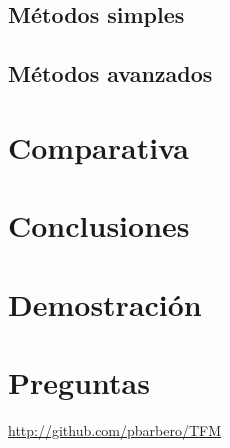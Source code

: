 \documentclass[10pt, spanish]{beamer}
\begin{document}
\subsection{M\'etodos simples}
\begin{frame}

\end{frame}

\subsection{M\'etodos avanzados}
\begin{frame}

\end{frame}


\section{Comparativa}
\begin{frame}

\end{frame}

\section{Conclusiones}
\begin{frame}

\end{frame}

\section{Demostraci\'on}
\begin{frame}

\end{frame}

\section{Preguntas}

\begin{frame}
	\begin{center}
		\href{http://github.com/pbarbero/TFM}{http://github.com/pbarbero/TFM}
	\end{center}
\end{frame}
\end{document}
